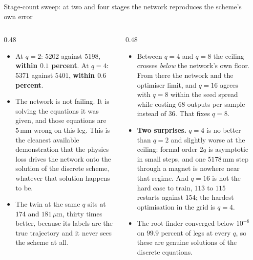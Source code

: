 \documentclass[aspectratio=169,10pt]{beamer}
\newcommand{\um}{\ensuremath{\,\mu\mathrm{m}}}
\newcommand{\mm}{\ensuremath{\,\mathrm{mm}}}
\newcommand{\hl}[1]{{\color{accent}\textbf{#1}}}
\begin{document}
\begin{frame}[shrink=25]{Stage-count sweep: at two and four stages the network reproduces the scheme's own error}
  \begin{columns}[T]
    \begin{column}{0.48\textwidth}
      {\small
      \begin{itemize}\small
        \item At $q = 2$: $5202$ against $5198$, \hl{within $0.1$ percent}. At
              $q = 4$: $5371$ against $5401$, \hl{within $0.6$ percent}.
        \item The network is not failing. It is solving the equations it was
              given, and those equations are $5\mm$ wrong on this leg. This is
              the cleanest available demonstration that the physics loss drives
              the network onto the solution of the discrete scheme, whatever
              that solution happens to be.
        \item The twin at the same $q$ sits at $174$ and $181\um$, thirty times
              better, because its labels are the true trajectory and it never
              sees the scheme at all.
      \end{itemize}}
    \end{column}
    \begin{column}{0.48\textwidth}
      {\small
      \begin{itemize}\small
        \item Between $q = 4$ and $q = 8$ the ceiling crosses \emph{below} the
              network's own floor. From there the network and the optimiser
              limit, and $q = 16$ agrees with $q = 8$ within the seed spread
              while costing $68$ outputs per sample instead of $36$. That fixes
              $q = 8$.
        \item \hl{Two surprises.} $q = 4$ is no better than $q = 2$ and slightly
              worse at the ceiling: formal order $2q$ is asymptotic in small
              steps, and one $5178\mm$ step through a magnet is nowhere near
              that regime. And $q = 16$ is not the hard case to train, $113$ to
              $115$ restarts against $154$; the hardest optimisation in the grid
              is $q = 4$.
        \item The root-finder converged below $10^{-8}$ on $99.9$ percent of
              legs at every $q$, so these are genuine solutions of the discrete
              equations.
      \end{itemize}}
    \end{column}
  \end{columns}
\end{frame}
\end{document}
